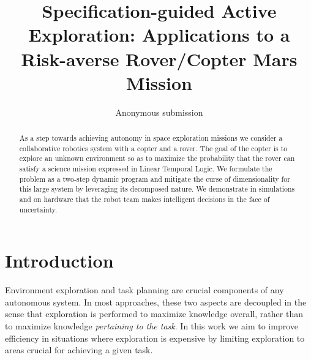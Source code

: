 \documentclass[conference]{IEEEtran}
\begin{document}



\title{\huge Specification-guided Active Exploration: Applications to a Risk-averse Rover/Copter Mars Mission}



\author{Anonymous submission}

\maketitle

\begin{abstract}
  As a step towards achieving autonomy in space exploration missions we consider a collaborative robotics system with a copter and a rover. The goal of the copter is to explore an unknown environment so as to maximize the probability that the rover can satisfy a science mission expressed in Linear Temporal Logic. We formulate the problem as a two-step dynamic program and mitigate the curse of dimensionality for this large system by leveraging its decomposed nature. We demonstrate in simulations and on hardware that the robot team makes intelligent decisions in the face of uncertainty.
\end{abstract}

\IEEEpeerreviewmaketitle

	

\section{Introduction}

Environment exploration and task planning are crucial components of any autonomous system. In most approaches, these two aspects are decoupled in the sense that exploration is performed to maximize knowledge overall, rather than to maximize knowledge \emph{pertaining to the task}. In this work we aim to improve efficiency in situations where exploration is expensive by limiting exploration to areas crucial for achieving a given task. 
\end{document}
